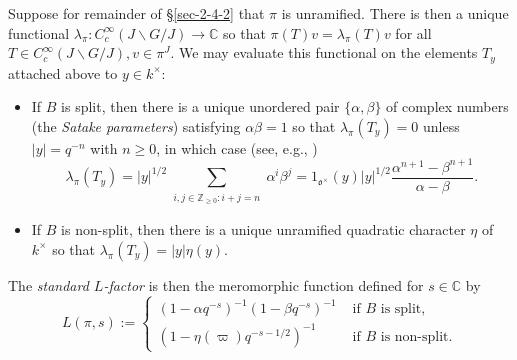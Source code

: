 \documentclass[reqno,10pt]{amsart}
\theoremstyle{plain} %
\theoremstyle{definition}
\theoremstyle{plain} %
\theoremstyle{remark}
\theoremstyle{itplain} %
\theoremstyle{remark} %
\renewcommand{\geq}{\geqslant}
\numberwithin{equation}{section}
\begin{document}
Suppose for remainder of \S\ref{sec-2-4-2} that $\pi$ is unramified.
There is then a unique functional $\lambda_\pi : C_c^\infty(J \backslash G / J) \rightarrow \mathbb{C}$ so that $\pi(T) v = \lambda_\pi(T) v$ for all $T \in C_c^\infty(J \backslash G / J), v \in \pi^J$.  We may evaluate this functional on the elements $T_y$ attached above to $y \in k^\times$:
\begin{itemize}
\item If $B$ is split, then there is a unique unordered pair $\{\alpha,\beta\}$ of complex numbers (the \emph{Satake parameters}) satisfying $\alpha \beta = 1$ so that $\lambda_\pi(T_y) = 0$ unless $|y| = q^{-n}$ with $n \geq 0$, in which case   (see, e.g., \cite[\S4.6]{MR1431508})
  \begin{equation}\label{eq:explicitf-romula-lambda-pi-tY}
    \lambda_\pi(T_y)
    = 
    |y|^{1/2}
    \sum _{\substack{
        i, j \in \mathbb{Z}_{\geq 0}:
        i + j = n
      }
    }
    \alpha^{i} \beta^j
    =
    1_{\mathfrak{o}^\times}(y)
    |y|^{1/2}
    \frac{\alpha^{n+1} - \beta^{n+1}}{\alpha - \beta }.
  \end{equation}

\item If $B$ is non-split, then there is a unique unramified quadratic character $\eta$ of $k^\times$ so that $\lambda_\pi(T_y) = |y| \eta(y)$.
\end{itemize}
The \emph{standard $L$-factor} is then the meromorphic function defined for $s \in \mathbb{C}$ by
\[
  L(\pi,s) := \begin{cases}
    (1 - \alpha q^{-s})^{-1} (1 - \beta q^{-s})^{-1} & \text{ if $B$ is split}, \\
    (1 - \eta(\varpi) q^{-s-1/2})^{-1} & \text{ if $B$ is non-split}.
  \end{cases}
\]
\end{document}
